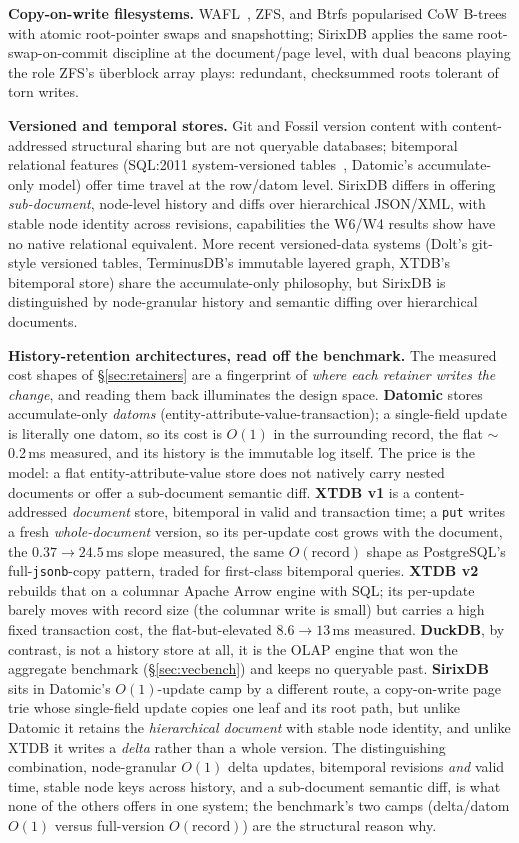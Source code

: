 \documentclass[11pt,a4paper,oneside]{report}
\theoremstyle{sirixthm}
\newcommand{\code}[1]{\texttt{#1}}
\begin{document}
\textbf{Copy-on-write filesystems.} WAFL~\cite{wafl}, ZFS, and Btrfs popularised CoW B-trees with atomic
root-pointer swaps and snapshotting; SirixDB applies the same root-swap-on-commit discipline at
the document/page level, with dual beacons playing the role ZFS's überblock array plays:
redundant, checksummed roots tolerant of torn writes.

\textbf{Versioned and temporal stores.} Git and Fossil version content with content-addressed
structural sharing but are not queryable databases; bitemporal relational features (SQL:2011
system-versioned tables~\cite{sql2011}, Datomic's accumulate-only model) offer time travel at the row/datom
level. SirixDB differs in offering \emph{sub-document}, node-level history and diffs over
hierarchical JSON/XML, with stable node identity across revisions, capabilities the W6/W4
results show have no native relational equivalent. More recent versioned-data systems (Dolt's
git-style versioned tables, TerminusDB's immutable layered graph, XTDB's bitemporal store) share the
accumulate-only philosophy, but SirixDB is distinguished by node-granular history and semantic diffing
over hierarchical documents.

\textbf{History-retention architectures, read off the benchmark.} The measured cost shapes of
\S\ref{sec:retainers} are a fingerprint of \emph{where each retainer writes the change}, and reading
them back illuminates the design space. \textbf{Datomic} stores accumulate-only \emph{datoms}
(entity-attribute-value-transaction); a single-field update is literally one datom, so its cost is
$O(1)$ in the surrounding record, the flat $\sim$0.2\,ms measured, and its history is the immutable log
itself. The price is the model: a flat entity-attribute-value store does not natively carry nested
documents or offer a sub-document semantic diff. \textbf{XTDB v1} is a content-addressed \emph{document}
store, bitemporal in valid and transaction time; a \code{put} writes a fresh \emph{whole-document}
version, so its per-update cost grows with the document, the $0.37\to24.5$\,ms slope measured, the same
$O(\text{record})$ shape as PostgreSQL's full-\code{jsonb}-copy pattern, traded for first-class bitemporal
queries. \textbf{XTDB v2} rebuilds that on a columnar Apache Arrow engine with SQL; its per-update barely
moves with record size (the columnar write is small) but carries a high fixed transaction cost, the
flat-but-elevated $8.6\to13$\,ms measured. \textbf{DuckDB}, by contrast, is not a history store at all,
it is the OLAP engine that won the aggregate benchmark (\S\ref{sec:vecbench}) and keeps no queryable past.
\textbf{SirixDB} sits in Datomic's $O(1)$-update camp by a different route, a copy-on-write page trie
whose single-field update copies one leaf and its root path, but unlike Datomic it retains the
\emph{hierarchical document} with stable node identity, and unlike XTDB it writes a \emph{delta} rather
than a whole version. The distinguishing combination, node-granular $O(1)$ delta updates, bitemporal
revisions \emph{and} valid time, stable node keys across history, and a sub-document semantic diff, is
what none of the others offers in one system; the benchmark's two camps (delta/datom $O(1)$ versus
full-version $O(\text{record})$) are the structural reason why.
\end{document}
